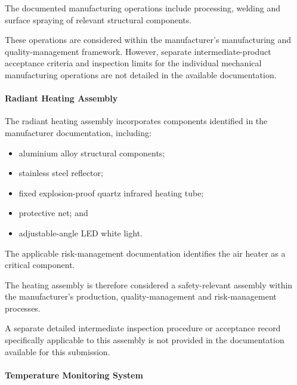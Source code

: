 The documented manufacturing operations include processing,
welding and surface spraying of relevant structural components.

These operations are considered within the manufacturer's
manufacturing and quality-management framework. However, separate
intermediate-product acceptance criteria and inspection limits for
the individual mechanical manufacturing operations are not detailed
in the available documentation.


\paragraph{Radiant Heating Assembly}

The radiant heating assembly incorporates components identified in
the manufacturer documentation, including:

\begin{itemize}
    \item aluminium alloy structural components;
    \item stainless steel reflector;
    \item fixed explosion-proof quartz infrared heating tube;
    \item protective net; and
    \item adjustable-angle LED white light.
\end{itemize}

The applicable risk-management documentation identifies the air
heater as a critical component.

The heating assembly is therefore considered a safety-relevant
assembly within the manufacturer's production, quality-management
and risk-management processes.

A separate detailed intermediate inspection procedure or acceptance
record specifically applicable to this assembly is not provided in
the documentation available for this submission.


\paragraph{Temperature Monitoring System}

